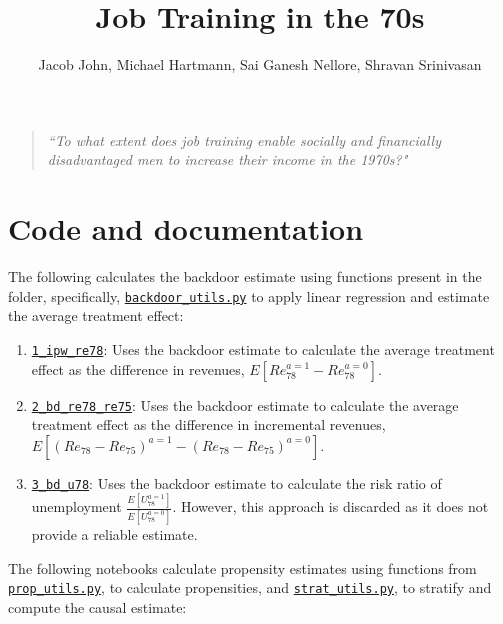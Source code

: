 \documentclass[12pt]{article}
\title{Job Training in the 70s}
\author{Jacob John, Michael Hartmann, Sai Ganesh Nellore, Shravan Srinivasan}
\begin{document}
\maketitle

\begin{tcolorbox}
\begin{quote} \centering \textit{``To what extent does job training enable socially and financially disadvantaged men to increase their income in the 1970s?"} \end{quote}
\end{tcolorbox}

\section{Code and documentation}

The following calculates the backdoor estimate using functions present in the  folder, specifically, \href{https://github.com/cs396s24/Proj-Job-Training/blob/main/utils/backdoor_utils.py}{\tt{backdoor\_utils.py}} to apply linear regression and estimate the average treatment effect:
\begin{enumerate}[itemsep=-0.25em]
    \item \href{https://github.com/cs396s24/Proj-Job-Training/blob/main/prop/1_ipw_re78.ipynb}{\tt{1\_ipw\_re78}}: Uses the backdoor estimate to calculate the average treatment effect as the difference in revenues, $E[Re_{78}^{a=1} - Re_{78}^{a=0}]$.
    \item \href{https://github.com/cs396s24/Proj-Job-Training/blob/main/prop/2_bd_re78_re75.ipynb}{\tt{2\_bd\_re78\_re75}}: Uses the backdoor estimate to calculate the average treatment effect as the difference in incremental revenues, $E[(Re_{78} - Re_{75})^{a=1} - (Re_{78} - Re_{75})^{a=0}]$.
    \item \href{https://github.com/cs396s24/Proj-Job-Training/blob/main/backdoor/3_bd_u78.ipynb}{\tt{3\_bd\_u78}}: Uses the backdoor estimate to calculate the risk ratio of unemployment $\frac{E[U_{78}^{a=1}]}{E[U_{78}^{a=0}]}$. However, this approach is discarded as it does not provide a reliable estimate.
\end{enumerate}
The following notebooks calculate propensity estimates using functions from \href{https://github.com/cs396s24/Proj-Job-Training/blob/main/utils/prop_utils.py}{\tt{prop\_utils.py}}, to calculate propensities, and \href{https://github.com/cs396s24/Proj-Job-Training/blob/main/utils/strat_utils.py}{\tt{strat\_utils.py}}, to stratify and compute the causal estimate:
\end{document}
